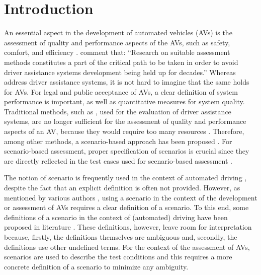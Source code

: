\section{Introduction}
\label{sec:introduction}

An essential aspect in the development of automated vehicles (AVs) is the assessment of quality and performance aspects of the AVs, such as safety, comfort, and efficiency \autocite{bengler2014threedecades, stellet2015taxonomy, Helmer2017safety, putz2017pegasus, roesener2017comprehensive, gietelink2006development, wachenfeld2016release}.
\textcite{bengler2014threedecades} comment that: ``Research on suitable assessment methods constitutes a part of the critical path to be taken in order to avoid driver assistance systems development being held up for decades.'' \cstart Whereas \textcite{bengler2014threedecades} address driver assistance systems, it is not hard to imagine that the same holds for AVs. \cend
For legal and public acceptance of AVs, a clear definition of system performance is important, as well as quantitative measures for system quality. 
Traditional methods, such as \autocite{response2006code, ISO26262}, used for the evaluation of driver assistance systems, are no longer sufficient for the assessment of quality and performance aspects of an AV, because they would require too \cstart many \cend resources \autocite{wachenfeld2016release}. 
Therefore, among other methods, a scenario-based approach has been proposed \autocite{elrofai2018scenario, putz2017pegasus}. 
For scenario-based assessment, proper specification of scenarios is crucial since they are directly reflected in the test cases used for scenario-based assessment \autocite{stellet2015taxonomy}. 

The notion of scenario is frequently used in the context of automated driving \autocite{putz2017pegasus, roesener2017comprehensive, gietelink2006development, hulshof2013autonomous, ebner2011identifying, ploeg2017GCDC, zofka2015datadrivetrafficscenarios, xiong2015orchestration, shao2019evaluating}, despite the fact that an explicit definition is often not provided. 
However, as mentioned by various authors \autocite{stellet2015taxonomy, Helmer2017safety, alvarez2017prospective, zofka2015datadrivetrafficscenarios, aparicio2013pre, putz2017pegasus, geyer2014, ulbrich2015}, using a scenario in the context of the development or assessment of AVs requires a clear definition of a scenario. 
To this end, some definitions of a scenario in the context of (automated) driving have been proposed in literature \autocite{geyer2014, ulbrich2015, elrofai2016scenario}.
These definitions, however, leave room for interpretation because, firstly, the definitions themselves are ambiguous and, secondly, the definitions use other undefined terms.
For the context of the assessment of AVs, scenarios are used to describe the test conditions \autocite{stellet2015taxonomy} and this requires a more concrete definition of a scenario to minimize any ambiguity.


